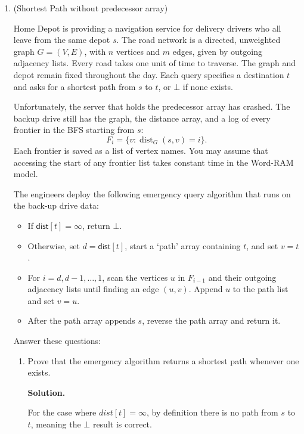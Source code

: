 \documentclass[11pt]{article}
\newenvironment{soln}{%
  \par\medskip\noindent\begingroup\color{blue}\textbf{Solution.}\ %
}{%
  \endgroup\par\medskip%
}
\begin{document}
\begin{enumerate}
\item (Shortest Path without predecessor array)

Home Depot is providing a navigation service for delivery drivers who all leave from the same depot $s$. The road network is a directed, unweighted graph $G=(V,E)$, with \(n\) vertices and \(m\) edges, given by outgoing adjacency lists. Every road takes one unit of time to traverse. The graph and depot remain fixed throughout the day. Each query specifies a destination \(t\) and asks for a shortest path from \(s\) to \(t\), or \(\bot\) if none exists.

Unfortunately, the server that holds the predecessor array has crashed. The backup drive still has the graph, the distance array, and a log of every frontier in the BFS starting from $s$:
\[
F_i=\{v:\operatorname{dist}_G(s,v)=i\}.
\]
Each frontier is saved as a list of vertex names. You may assume that accessing the start of any frontier list takes constant time in the Word-RAM model.

The engineers deploy the following emergency query algorithm that runs on the back-up drive data:

\begin{itemize}
\item If \(\mathsf{dist}[t]=\infty\), return \(\bot\).
\item Otherwise, set \(d=\mathsf{dist}[t]\), start a `path' array containing \(t\), and set \(v=t\).
\item For \(i=d,d-1,\ldots,1\), scan the vertices \(u\) in \(F_{i-1}\) and their outgoing adjacency lists until finding an edge \((u,v)\). Append \(u\) to the path list and set \(v=u\).
\item After the path array appends $s$, reverse the path array and return it.
\end{itemize}

Answer these questions:

\begin{enumerate}
\item Prove that the emergency algorithm returns a shortest path whenever one exists.

\begin{soln}
For the case where $dist[t]=\infty$, by definition there is no path from $s$ to $t$, meaning the $\bot$ result is correct.


\end{soln}
\end{enumerate}
\end{enumerate}
\end{document}

